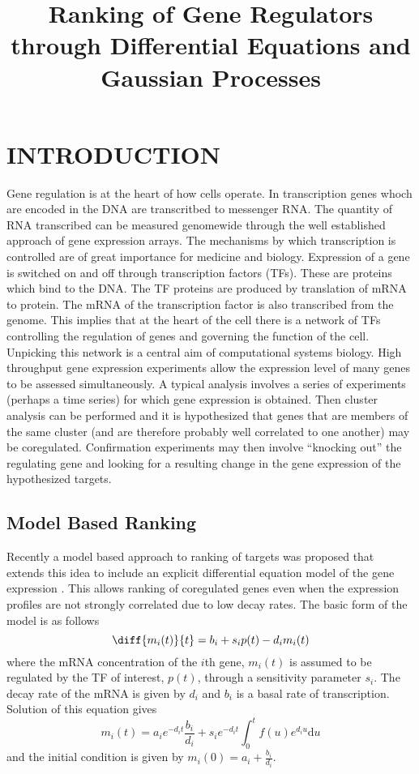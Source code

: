 \documentclass{article}
\title{Ranking of Gene Regulators through Differential Equations and Gaussian Processes}
\begin{document}
\maketitle

\begin{abstract}
\end{abstract}

\section{INTRODUCTION}

Gene regulation is at the heart of how cells operate. In transcription
genes  whoch are  encoded in  the  DNA are  transcritbed to  messenger
RNA.  The  quantity of  RNA  transcribed  can  be measured  genomewide
through the  well established approach of gene  expression arrays. The
mechanisms  by   which  transcription  is  controlled   are  of  great
importance for medicine and biology.  Expression of a gene is switched
on  and off through  transcription factors  (TFs). These  are proteins
which bind to the DNA. The  TF proteins are produced by translation of
mRNA  to  protein.  The  mRNA  of the  transcription  factor  is  also
transcribed from  the genome.  This implies that  at the heart  of the
cell there is a network of TFs controlling the regulation of genes and
governing  the function  of  the  cell. Unpicking  this  network is  a
central  aim of  computational systems  biology. High  throughput gene
expression experiments allow the expression  level of many genes to be
assessed  simultaneously.  A typical  analysis  involves  a series  of
experiments  (perhaps a  time  series) for  which  gene expression  is
obtained.  Then   cluster  analysis  can   be  performed  and   it  is
hypothesized that genes that are  members of the same cluster (and are
therefore   probably  well   correlated   to  one   another)  may   be
coregulated.  Confirmation  experiments  may then  involve  ``knocking
out'' the  regulating gene and looking  for a resulting  change in the
gene expression of the hypothesized targets.

\subsection{Model Based Ranking}

Recently a  model based  approach to ranking  of targets  was proposed
that extends  this idea to  include an explicit  differential equation
model of  the gene expression \cite{Barenco:ranked06}. This  allows ranking of
coregulated genes  even when the expression profiles  are not strongly
correlated due to  low decay rates. The basic form of  the model is as
follows
\[
\diff{m_i(t)}{t} = b_i + s_i p(t) - d_i m_i(t)
\]
where the mRNA concentration of the $i$th gene, $m_i(t)$ is assumed to
be  regulated by  the TF  of interest,  $p(t)$, through  a sensitivity
parameter $s_i$.  The decay  rate of  the mRNA is  given by  $d_i$ and
$b_i$  is a  basal rate  of transcription.  Solution of  this equation
gives
\[
m_i(t) = a_i e^{-d_it} \frac{b_i}{d_i} + s_i
e^{-d_it}\int_0^tf(u)e^{d_i u}\mathrm{d} u \label{eq:linearOperator}
\]
and the initial condition is given by $m_i(0)=a_i + \frac{b_i}{d_i}$. 
\end{document}
